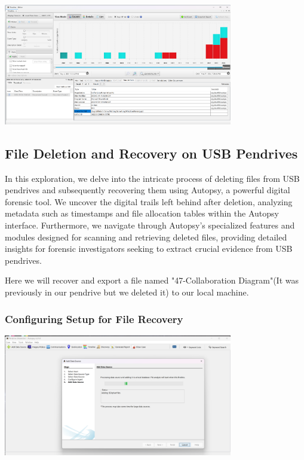 \documentclass{extarticle}
\begin{document}
\begin{center}
    \includegraphics[width=0.75\textwidth]{4/4.2/Timeline View-2.png}
\end{center}

\subsection{File Deletion and Recovery on USB Pendrives}
 In this exploration, we delve into the intricate process of deleting files from USB pendrives and subsequently recovering them using Autopsy, a powerful digital forensic tool. We uncover the digital trails left behind after deletion, analyzing metadata such as timestamps and file allocation tables within the Autopsy interface. Furthermore, we navigate through Autopsy's specialized features and modules designed for scanning and retrieving deleted files, providing detailed insights for forensic investigators seeking to extract crucial evidence from USB pendrives.

 Here we will recover and export a file named "47-Collaboration Diagram"(It was previously in our pendrive but we deleted it) to our local machine.

\subsubsection*{Configuring Setup for File Recovery}
\begin{center}
    \includegraphics[width=0.75\textwidth]{4.3/Screenshot (414).png}
\end{center}
\end{document}
